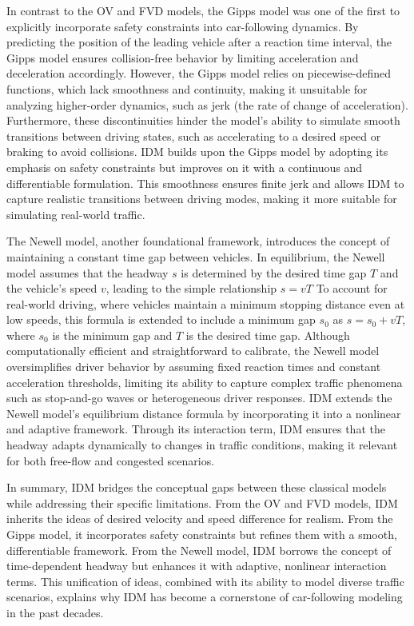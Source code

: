 \documentclass[a4paper,fleqn,11pt]{reviewresponse}
\renewenvironment{quotation}
  {\begingroup\color{customblue}%
   \captionsetup{labelfont={bf},textfont={color=customblue},font={color=customblue}}%
   \list{}{\leftmargin=0em \rightmargin=0em} %
   \item\relax\small}
  {\endlist\endgroup}
\begin{document}
\begin{quotation}
In contrast to the OV and FVD models, the Gipps model was one of the first to explicitly incorporate safety constraints into car-following dynamics. By predicting the position of the leading vehicle after a reaction time interval, the Gipps model ensures collision-free behavior by limiting acceleration and deceleration accordingly. However, the Gipps model relies on piecewise-defined functions, which lack smoothness and continuity, making it unsuitable for analyzing higher-order dynamics, such as jerk (the rate of change of acceleration). Furthermore, these discontinuities hinder the model’s ability to simulate smooth transitions between driving states, such as accelerating to a desired speed or braking to avoid collisions. IDM builds upon the Gipps model by adopting its emphasis on safety constraints but improves on it with a continuous and differentiable formulation. This smoothness ensures finite jerk and allows IDM to capture realistic transitions between driving modes, making it more suitable for simulating real-world traffic.

The Newell model, another foundational framework, introduces the concept of maintaining a constant time gap between vehicles. In equilibrium, the Newell model assumes that the headway $s$ is determined by the desired time gap $T$ and the vehicle's speed $v$, leading to the simple relationship $s = vT$
To account for real-world driving, where vehicles maintain a minimum stopping distance even at low speeds, this formula is extended to include a minimum gap $s_0$ as $s = s_0 + vT$, where $s_0$ is the minimum gap and $T$ is the desired time gap. Although computationally efficient and straightforward to calibrate, the Newell model oversimplifies driver behavior by assuming fixed reaction times and constant acceleration thresholds, limiting its ability to capture complex traffic phenomena such as stop-and-go waves or heterogeneous driver responses. IDM extends the Newell model’s equilibrium distance formula by incorporating it into a nonlinear and adaptive framework. Through its interaction term, IDM ensures that the headway adapts dynamically to changes in traffic conditions, making it relevant for both free-flow and congested scenarios.

In summary, IDM bridges the conceptual gaps between these classical models while addressing their specific limitations. From the OV and FVD models, IDM inherits the ideas of desired velocity and speed difference for realism. From the Gipps model, it incorporates safety constraints but refines them with a smooth, differentiable framework. From the Newell model, IDM borrows the concept of time-dependent headway but enhances it with adaptive, nonlinear interaction terms. This unification of ideas, combined with its ability to model diverse traffic scenarios, explains why IDM has become a cornerstone of car-following modeling in the past decades.

\end{quotation}
\end{document}
